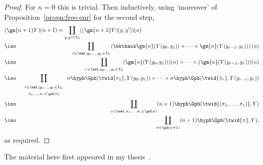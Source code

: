 \begin{proof}
For $n=0$ this is trivial.  Then inductively, using `moreover' of
Proposition~\ref{propn:free-enr} for the second step,
%
\begin{eqnarray*}
\lefteqn{(\gm{n+1} Y)(n+1)
=
\coprod_{y,y' \in Y_0} ((\gm{n+1} Y)(y,y'))(n)}				\\
	&\iso	&\coprod_{r\in\nat, y_0, \ldots, y_r \in Y_0}
\left(\bkthack
	\gm{n}(Y(y_0,y_1)) \times\cdots\times \gm{n}(Y(y_{r-1},y_r))
\right) (n)								\\
	&\iso	&\coprod_{r\in\nat, y_0, \ldots, y_r \in Y_0}
(\gm{n}(Y(y_0,y_1)))(n) \times\cdots\times (\gm{n}(Y(y_{r-1},y_r)))(n)	\\
	&\iso	&\coprod_{\begin{array}{c}\scriptstyle
			r\in\nat, y_0, \ldots, y_r \in Y_0,\\ \scriptstyle
			\pi_1, \ldots, \pi_r \in \pd(n)
			\end{array}}
		n\hyph\Gph(\twid{\pi_1}, Y(y_0,y_1))
		\times\cdots\times
		n\hyph\Gph(\twid{\pi_r}, Y(y_{r-1},y_r))		\\
	&\iso	&\coprod_{r\in\nat, \pi_1, \ldots, \pi_r \in \pd(n)}
		(n+1)\hyph\Gph(\twid{(\pi_1, \ldots, \pi_r)}, Y)	\\
	&\iso	&\coprod_{\pi\in\pd(n+1)}
		(n+1)\hyph\Gph(\twid{\pi},Y),
\end{eqnarray*}
as required.
\done
\end{proof}%
%
%



\begin{notes}

The material here first appeared in my thesis~\cite[App.~C]{OHDCT}.%
%
%
%
%


\end{notes}
